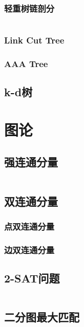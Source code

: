 \documentclass[a4paper]{article}
\newcommand{\cppcode}[1]{
    \inputminted[mathescape]{cpp}{source/#1}
}
\begin{document}
\subsubsection{轻重树链剖分}

\cppcode{data-structure/heavy-light-decomposition.cpp}

\subsubsection{Link Cut Tree}

\subsubsection{AAA Tree}

\subsection{k-d树}

\section{图论}

\subsection{强连通分量}

\cppcode{graph-theory/strongly-connected-components.cpp}

\subsection{双连通分量}

\subsubsection{点双连通分量}

\subsubsection{边双连通分量}

\subsection{2-SAT问题}

\cppcode{graph-theory/two-satisfiability.cpp}

\subsection{二分图最大匹配}
\end{document}

